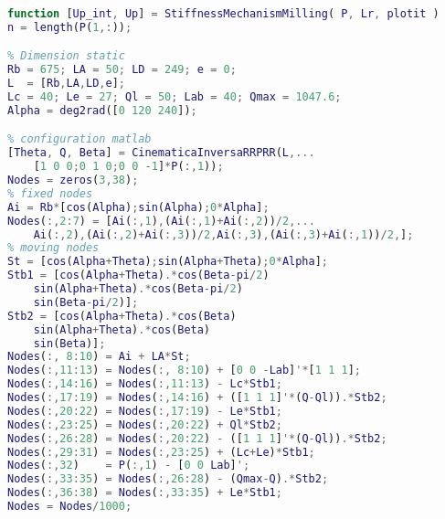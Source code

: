 \begin{lstlisting}[frame=single,language = matlab]
function [Up_int, Up] = StiffnessMechanismMilling( P, Lr, plotit )
n = length(P(1,:));

% Dimension static
Rb = 675; LA = 50; LD = 249; e = 0;
L  = [Rb,LA,LD,e];
Lc = 40; Le = 27; Ql = 50; Lab = 40; Qmax = 1047.6;
Alpha = deg2rad([0 120 240]);

% configuration matlab
[Theta, Q, Beta] = CinematicaInversaRRPRR(L,...
    [1 0 0;0 1 0;0 0 -1]*P(:,1));
Nodes = zeros(3,38);
% fixed nodes
Ai = Rb*[cos(Alpha);sin(Alpha);0*Alpha];
Nodes(:,2:7) = [Ai(:,1),(Ai(:,1)+Ai(:,2))/2,...
    Ai(:,2),(Ai(:,2)+Ai(:,3))/2,Ai(:,3),(Ai(:,3)+Ai(:,1))/2,];
% moving nodes
St = [cos(Alpha+Theta);sin(Alpha+Theta);0*Alpha];
Stb1 = [cos(Alpha+Theta).*cos(Beta-pi/2)
    sin(Alpha+Theta).*cos(Beta-pi/2)
    sin(Beta-pi/2)];
Stb2 = [cos(Alpha+Theta).*cos(Beta)
    sin(Alpha+Theta).*cos(Beta)
    sin(Beta)];
Nodes(:, 8:10) = Ai + LA*St;
Nodes(:,11:13) = Nodes(:, 8:10) + [0 0 -Lab]'*[1 1 1];
Nodes(:,14:16) = Nodes(:,11:13) - Lc*Stb1;
Nodes(:,17:19) = Nodes(:,14:16) + ([1 1 1]'*(Q-Ql)).*Stb2;
Nodes(:,20:22) = Nodes(:,17:19) - Le*Stb1;
Nodes(:,23:25) = Nodes(:,20:22) + Ql*Stb2;
Nodes(:,26:28) = Nodes(:,20:22) - ([1 1 1]'*(Q-Ql)).*Stb2;
Nodes(:,29:31) = Nodes(:,23:25) + (Lc+Le)*Stb1;
Nodes(:,32)    = P(:,1) - [0 0 Lab]';
Nodes(:,33:35) = Nodes(:,26:28) - (Qmax-Q).*Stb2;
Nodes(:,36:38) = Nodes(:,33:35) + Le*Stb1;
Nodes = Nodes/1000;


\end{lstlisting}
